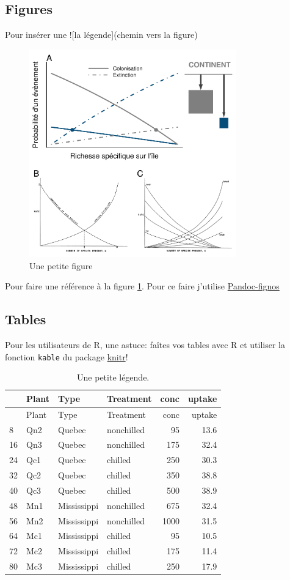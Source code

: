 \subsection*{Figures}\label{figures}

Pour insérer une !{[}la légende{]}(chemin vers la figure)

\begin{figure}
\centering
\includegraphics[width=0.80000\textwidth]{fig/fig1.pdf}
\caption{Une petite figure\label{fig:intr1}}
\end{figure}

Pour faire une référence à la figure \ref{fig:intr1}. Pour ce faire
j'utilise \href{https://github.com/tomduck/pandoc-fignos}{Pandoc-fignos}

\subsection*{Tables}\label{tables}

Pour les utilisateurs de R, une astuce: faîtes vos tables avec R et
utiliser la fonction \texttt{kable} du package
\href{http://yihui.name/knitr/}{knitr}!

\begin{longtable}[]{@{}llllrr@{}}
\caption{Une petite légende. \label{tbl:intr_1}}\tabularnewline
\toprule
& Plant & Type & Treatment & conc & uptake\tabularnewline
\midrule
\endfirsthead
\toprule
& Plant & Type & Treatment & conc & uptake\tabularnewline
\midrule
\endhead
8 & Qn2 & Quebec & nonchilled & 95 & 13.6\tabularnewline
16 & Qn3 & Quebec & nonchilled & 175 & 32.4\tabularnewline
24 & Qc1 & Quebec & chilled & 250 & 30.3\tabularnewline
32 & Qc2 & Quebec & chilled & 350 & 38.8\tabularnewline
40 & Qc3 & Quebec & chilled & 500 & 38.9\tabularnewline
48 & Mn1 & Mississippi & nonchilled & 675 & 32.4\tabularnewline
56 & Mn2 & Mississippi & nonchilled & 1000 & 31.5\tabularnewline
64 & Mc1 & Mississippi & chilled & 95 & 10.5\tabularnewline
72 & Mc2 & Mississippi & chilled & 175 & 11.4\tabularnewline
80 & Mc3 & Mississippi & chilled & 250 & 17.9\tabularnewline
\bottomrule
\end{longtable}

